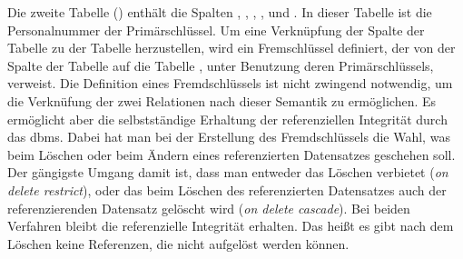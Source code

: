 Die zweite Tabelle () enthält die Spalten 
, , , ,  und .
In dieser Tabelle ist die Personalnummer der Primärschlüssel.
Um eine Verknüpfung der Spalte  der Tabelle  zu der Tabelle  herzustellen, 
wird ein Fremschlüssel definiert, der von der Spalte  der Tabelle  auf die Tabelle , 
unter Benutzung deren Primärschlüssels, verweist.
Die Definition eines Fremdschlüssels ist nicht zwingend notwendig, um die Verknüfung der zwei Relationen nach dieser Semantik zu ermöglichen.
Es ermöglicht aber die selbstständige Erhaltung der referenziellen In­te­g­ri­tät durch das \ac{dbms}. 
Dabei hat man bei der Erstellung des Fremdschlüssels die Wahl, was beim Löschen oder beim Ändern eines referenzierten Datensatzes geschehen soll.
Der gängigste Umgang damit ist, dass man entweder das Löschen verbietet (\emph{on delete restrict}),
oder das beim Löschen des referenzierten Datensatzes auch der referenzierenden Datensatz gelöscht wird (\emph{on delete cascade}).
Bei beiden Verfahren bleibt die referenzielle In­te­g­ri­tät erhalten.
Das heißt es gibt nach dem Löschen keine Referenzen, die nicht aufgelöst werden können.

